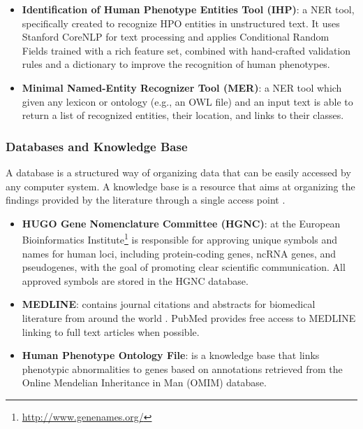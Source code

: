 \documentclass[11pt]{article}
\begin{document}
\begin{itemize}

\item{\textbf{Identification of Human Phenotype Entities Tool (IHP)}: a NER tool, specifically created to recognize HPO entities in unstructured text. It uses Stanford CoreNLP \cite{Manning2014} for text processing and applies Conditional Random Fields trained with a rich feature set, combined with hand-crafted validation rules and a dictionary to improve the recognition of human phenotypes.}

\item{\textbf{Minimal Named-Entity Recognizer Tool (MER)}: a NER tool which given any lexicon or ontology (e.g., an OWL file) and an input text is able to return a list of recognized entities, their location, and links to their classes.}

\end{itemize}


\hypertarget{11}{\subsubsection{Databases and Knowledge Base}}

A database is a structured way of organizing data that can be easily accessed by any computer system. A knowledge base is a resource that aims at organizing the findings provided by the literature through a single access point \cite{10.3389/fimmu.2017.01656}.

\begin{itemize}

\item{\textbf{HUGO Gene Nomenclature Committee (HGNC)}: at the European Bioinformatics Institute\footnote{\url{http://www.genenames.org/}} is responsible for approving unique symbols and names for human loci, including protein-coding genes, ncRNA genes, and pseudogenes, with the goal of promoting clear scientific communication. All approved symbols are stored in the HGNC database.}

\item{\textbf{MEDLINE}: contains journal citations and abstracts for biomedical literature from around the world \cite{Greenhalgh180}. PubMed provides free access to MEDLINE linking to full text articles when possible.}

\item{\textbf{Human Phenotype Ontology File}: is a knowledge base
that links phenotypic abnormalities to genes based on annotations retrieved from the Online Mendelian Inheritance in Man (OMIM) database.}

\end{itemize}
\end{document}
